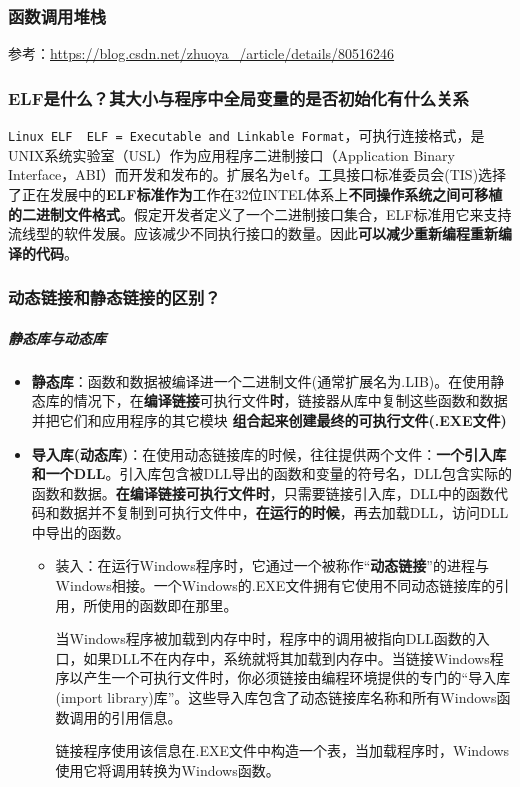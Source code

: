 \documentclass[UTF8,a4paper,8pt]{ctexart}
\begin{document}
		
		
		\subsubsection{函数调用堆栈}
			参考：\url{https://blog.csdn.net/zhuoya_/article/details/80516246}
				
		\subsubsection{ELF是什么？其大小与程序中全局变量的是否初始化有什么关系}
			\verb|Linux ELF  ELF = Executable and Linkable Format|，可执行连接格式，是UNIX系统实验室（USL）作为应用程序二进制接口（Application Binary Interface，ABI）而开发和发布的。扩展名为\verb|elf|。工具接口标准委员会(TIS)选择了正在发展中的\textbf{ELF标准作为}工作在32位INTEL体系上\textbf{不同操作系统之间可移植的二进制文件格式}。假定开发者定义了一个二进制接口集合，ELF标准用它来支持流线型的软件发展。应该减少不同执行接口的数量。因此\textbf{可以减少重新编程重新编译的代码}。
			
		\subsubsection{动态链接和静态链接的区别？}
			\subparagraph{静态库与动态库}
			\begin{itemize}[itemindent = 1em]
				\item \textbf{静态库}：函数和数据被编译进一个二进制文件(通常扩展名为.LIB)。在使用静态库的情况下，在\textbf{编译链接}可执行文件\textbf{时}，链接器从库中复制这些函数和数据并把它们和应用程序的其它模块	\textbf{组合起来创建最终的可执行文件(.EXE文件)}
				
				\item \textbf{导入库(动态库)}：在使用动态链接库的时候，往往提供两个文件：\textbf{一个引入库和一个DLL}。引入库包含被DLL导出的函数和变量的符号名，DLL包含实际的函数和数据。\textbf{在编译链接可执行文件时}，只需要链接引入库，DLL中的函数代码和数据并不复制到可执行文件中，\textbf{在运行的时候}，再去加载DLL，访问DLL中导出的函数。
				
					\begin{itemize}
						\item 装入：在运行Windows程序时，它通过一个被称作“\textbf{动态链接}”的进程与Windows相接。一个Windows的.EXE文件拥有它使用不同动态链接库的引用，所使用的函数即在那里。
						
						当Windows程序被加载到内存中时，程序中的调用被指向DLL函数的入口，如果DLL不在内存中，系统就将其加载到内存中。当链接Windows程序以产生一个可执行文件时，你必须链接由编程环境提供的专门的“导入库(import library)库”。这些导入库包含了动态链接库名称和所有Windows函数调用的引用信息。
						
						链接程序使用该信息在.EXE文件中构造一个表，当加载程序时，Windows使用它将调用转换为Windows函数。
					\end{itemize}
			\end{itemize}
			
\end{document}
